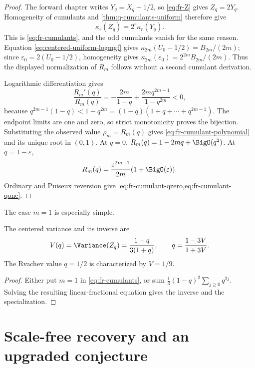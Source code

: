 \begin{proof}
The forward chapter writes \(Y_q=X_q-1/2\), so \cref{eq:fr-Z} gives
\(Z_q=2Y_q\).  Homogeneity of cumulants and
\cref{thm:q-cumulants-uniform} therefore give
\[
 \kappa_r(Z_q)=2^r\kappa_r(Y_q).
\]
This is \cref{eq:fr-cumulants}, and the odd cumulants vanish for the same
reason.  Equation \eqref{eq:centered-uniform-logmgf} gives
\(\kappa_{2m}(U_0-1/2)=B_{2m}/(2m)\); since
\(\varepsilon_0=2(U_0-1/2)\), homogeneity gives
\(\kappa_{2m}(\varepsilon_0)=2^{2m}B_{2m}/(2m)\).  Thus the displayed
normalization of \(R_m\) follows without a second cumulant derivation.

Logarithmic differentiation gives
\[
 \frac{R_m'(q)}{R_m(q)}
 =-\frac{2m}{1-q}+\frac{2mq^{2m-1}}{1-q^{2m}}<0,
\]
because
\(q^{2m-1}(1-q)<1-q^{2m}=(1-q)(1+q+\cdots+q^{2m-1})\).
The endpoint limits are one and zero, so strict monotonicity proves the
bijection.  Substituting the observed value \(\rho_m=R_m(q)\) gives
\cref{eq:fr-cumulant-polynomial} and its unique root in \((0,1)\).
At \(q=0\), \(R_m(q)=1-2mq+\BigO(q^2)\).  At \(q=1-\varepsilon\),
\[
 R_m(q)=\frac{\varepsilon^{2m-1}}{2m}
 (1+\BigO(\varepsilon)).
\]
Ordinary and Puiseux reversion give
\cref{eq:fr-cumulant-qzero,eq:fr-cumulant-qone}.
\end{proof}

The case \(m=1\) is especially simple.

\begin{corollary}
\label{cor:fr-variance-inverse}
The centered variance and its inverse are
\begin{equation}
 V(q)=\Variance(Z_q)=\frac{1-q}{3(1+q)},
 \qquad q=\frac{1-3V}{1+3V}.
 \label{eq:fr-variance-inverse}
\end{equation}
The Rvachev value \(q=1/2\) is characterized by \(V=1/9\).
\end{corollary}

\begin{proof}
Either put \(m=1\) in \cref{eq:fr-cumulants}, or sum
\(\frac13(1-q)^2\sum_{j\ge0}q^{2j}\).  Solving the resulting
linear-fractional equation gives the inverse and the specialization.
\end{proof}

\section{Scale-free recovery and an upgraded conjecture}
\label{sec:fr-scale-free}

